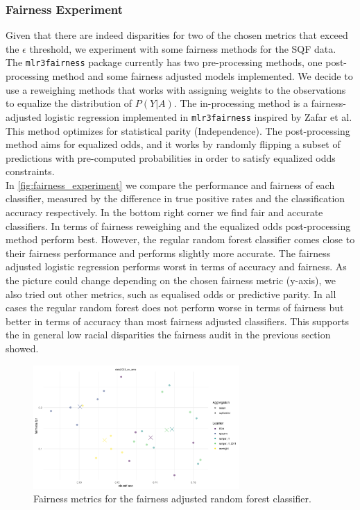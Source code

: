 \subsubsection*{Fairness Experiment}
Given that there are indeed disparities for two of the chosen metrics that exceed the $\epsilon$ threshold, we experiment with some fairness methods for the SQF data.
The \texttt{mlr3fairness} package currently has two pre-processing methods, one post-processing method and some fairness adjusted models implemented. We decide to use a reweighing methods that works with assigning weights to the observations to equalize the distribution of $P(Y|A)$.
The in-processing method is a fairness-adjusted logistic regression implemented in \texttt{mlr3fairness} inspired by Zafar et al. This method optimizes for statistical parity (Independence). The post-processing method aims for equalized odds, and it works by randomly flipping a subset of predictions with pre-computed probabilities in order to satisfy equalized odds constraints. {\color{red}{reference to mlr3fairness book}} \\
In \autoref{fig:fairness_experiment} we compare the performance and fairness of each classifier, measured by the difference in true positive rates and the classification accuracy respectively. In the bottom right corner we find fair and accurate classifiers. In terms of fairness reweighing and the equalized odds post-processing method perform best. However, the regular random forest classifier comes close to their fairness performance and performs slightly more accurate. The fairness adjusted logistic regression performs worst in terms of accuracy and fairness.
As the picture could change depending on the chosen fairness metric (y-axis), we also tried out other metrics, such as equalised odds or predictive parity. In all cases the regular random forest does not perform worse in terms of fairness but better in terms of accuracy than most fairness adjusted classifiers. This supports the in general low racial disparities the fairness audit in the previous section showed.

\begin{figure}
    \centering
    \includegraphics[width=0.7\textwidth]{../figures/sqf_case_study_plot3.png}
    \caption{Fairness metrics for the fairness adjusted random forest classifier.}
    \label{fig:fairness_experiment}
\end{figure}

